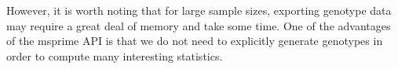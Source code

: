 \documentclass[graybox]{svmult}
\begin{document}
However, it is worth noting that for large sample sizes, exporting
genotype data may require a great deal of memory and take some time. One
of the advantages of the msprime API is that we do not need to
explicitly generate genotypes in order to compute many interesting
statistics.







\end{document}
